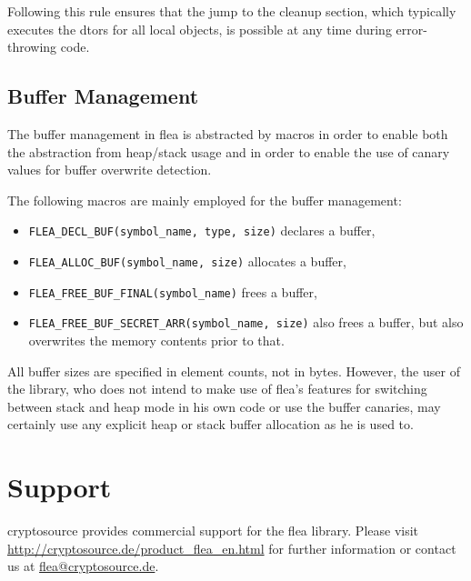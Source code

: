 \documentclass[a4paper,11pt]{scrartcl}
\begin{document}
Following this rule ensures that the jump to the cleanup section, which
typically executes the dtors for all local objects, is possible at any time
during error-throwing code.

\subsection{Buffer Management}
The buffer management in flea is abstracted by macros in order to enable both
the abstraction from heap/stack usage and in order to enable the use of canary
values for buffer overwrite detection.

The following  macros are mainly employed for the buffer management:
\begin{itemize}
  \item \verb#FLEA_DECL_BUF(symbol_name, type, size)# declares a buffer, 
  \item \verb#FLEA_ALLOC_BUF(symbol_name, size)# allocates a buffer, 
  \item \verb#FLEA_FREE_BUF_FINAL(symbol_name)# frees a buffer,
  \item \verb#FLEA_FREE_BUF_SECRET_ARR(symbol_name, size)# also frees a buffer,
    but also overwrites the memory contents prior to that.
\end{itemize}
All buffer sizes are specified in element counts, not in bytes. However, the
user of the library, who does not intend to make use of flea's features for 
switching between stack and heap mode in his own code or use the buffer
canaries, may certainly use any explicit heap or stack buffer allocation as he
is used to.

\section{Support}
cryptosource provides commercial support for the flea library. Please visit
\url{http://cryptosource.de/product_flea_en.html} for further information or
contact us at \url{flea@cryptosource.de}.
\end{document}
